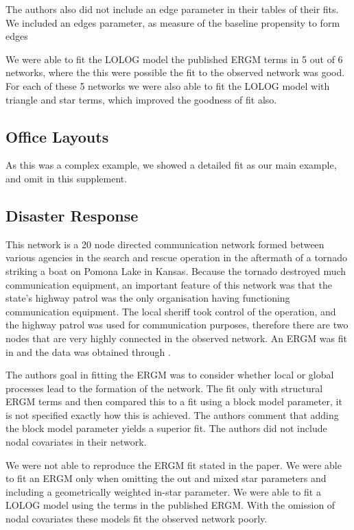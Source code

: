 \documentclass[
]{statsoc}
\begin{document}
The authors also did not include an edge parameter in their tables of
their fits. We included an edges parameter, as measure of the baseline
propensity to form edges

We were able to fit the LOLOG model the published ERGM terms in 5 out of
6 networks, where the this were possible the fit to the observed network
was good. For each of these 5 networks we were also able to fit the
LOLOG model with triangle and star terms, which improved the goodness of
fit also.

\subsection{Office Layouts}

As this was a complex example, we showed a detailed fit as our main
example, and omit in this supplement.

\subsection{Disaster Response}

This network is a 20 node directed communication network formed between
various agencies in the search and rescue operation in the aftermath of
a tornado striking a boat on Pomona Lake in Kansas. Because the tornado
destroyed much communication equipment, an important feature of this
network was that the state's highway patrol was the only organisation
having functioning communication equipment. The local sheriff took
control of the operation, and the highway patrol was used for
communication purposes, therefore there are two nodes that are very
highly connected in the observed network. An ERGM was fit in
\cite{Doreian2012} and the data was obtained through
\cite{DisasterData}.

The authors goal in fitting the ERGM was to consider whether local or
global processes lead to the formation of the network. The fit only with
structural ERGM terms and then compared this to a fit using a block
model parameter, it is not specified exactly how this is achieved. The
authors comment that adding the block model parameter yields a superior
fit. The authors did not include nodal covariates in their network.

We were not able to reproduce the ERGM fit stated in the paper. We were
able to fit an ERGM only when omitting the out and mixed star parameters
and including a geometrically weighted in-star parameter. We were able
to fit a LOLOG model using the terms in the published ERGM. With the
omission of nodal covariates these models fit the observed network
poorly.
\end{document}
